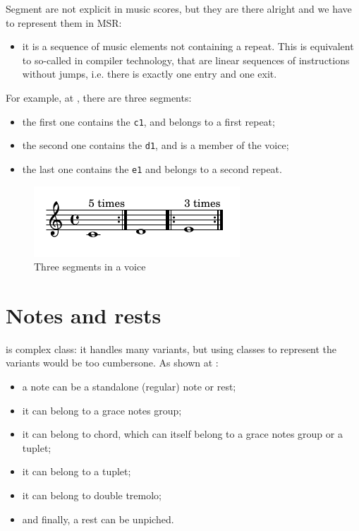 Segment are not explicit in music scores, but they are there alright and we have to represent them in MSR:
\begin{itemize}
\item it is a sequence of music elements not containing a repeat. This is equivalent to so-called  in compiler technology, that are linear sequences of instructions without jumps, i.e. there is exactly one entry and one exit.%
\end{itemize}

For example, at , there are three segments:
\begin{itemize}
\item the first one contains the {\tt c1}, and belongs to a first repeat;
\item the second one contains the {\tt d1}, and is a member of the voice;
\item the last one contains the {\tt e1} and belongs to a second repeat.
\end{itemize}

\begin{figure}[htbp]
\begin{center}
\includegraphics{../mfgraphics/mfgraphicsRepeatFollowedByANoteAndARepeat.png}

\caption{Three segments in a voice}
\label{Three segments in a voice}
\end{center}
\end{figure}


\section{Notes and rests}\label{Notes and rests}

 is complex class: it handles many variants, but using classes to represent the variants would be too cumbersone. As shown at :
\begin{itemize}
\item a note can be a standalone (regular) note or rest;
\item it can belong to a grace notes group;
\item it can belong to chord, which can itself belong to a grace notes group or a tuplet;
\item it can belong to a tuplet;
\item it can belong to double tremolo;
\item and finally, a rest can be unpiched.
\end{itemize}

